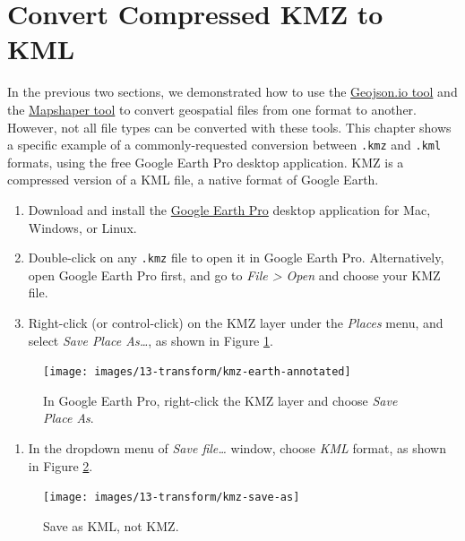 \documentclass[
  english,
]{book}
\providecommand{\tightlist}{%
  \setlength{\itemsep}{0pt}\setlength{\parskip}{0pt}}
\begin{document}
\hypertarget{convert-kmz}{%
\section*{Convert Compressed KMZ to KML}\label{convert-kmz}}

In the previous two sections, we demonstrated how to use the \href{geojsonio.html}{Geojson.io tool} and the \href{mapshaper.html}{Mapshaper tool}
to convert geospatial files from one format to another. However, not all file types can be converted with these tools.
This chapter shows a specific example of a commonly-requested conversion between \texttt{.kmz} and \texttt{.kml} formats, using the free Google Earth Pro desktop application. KMZ is a compressed version of a KML file, a native format of Google Earth.

\begin{enumerate}
\def\labelenumi{\arabic{enumi}.}
\item
  Download and install the \href{https://www.google.com/earth/versions/}{Google Earth Pro} desktop application for Mac, Windows, or Linux.
\item
  Double-click on any \texttt{.kmz} file to open it in Google Earth Pro. Alternatively, open Google Earth Pro first,
  and go to \emph{File \textgreater{} Open} and choose your KMZ file.
\item
  Right-click (or control-click) on the KMZ layer under the \emph{Places} menu, and select \emph{Save Place As\ldots{}}, as shown in Figure \ref{fig:kmz-earth}.
\end{enumerate}



\begin{figure}
\texttt{[image: images/13-transform/kmz-earth-annotated]} \caption{In Google Earth Pro, right-click the KMZ layer and choose \emph{Save Place As}.}\label{fig:kmz-earth}
\end{figure}

\begin{enumerate}
\def\labelenumi{\arabic{enumi}.}
\setcounter{enumi}{3}
\tightlist
\item
  In the dropdown menu of \emph{Save file\ldots{}} window, choose \emph{KML} format, as shown in Figure \ref{fig:kmz-save-as}.
\end{enumerate}



\begin{figure}
\texttt{[image: images/13-transform/kmz-save-as]} \caption{Save as KML, not KMZ.}\label{fig:kmz-save-as}
\end{figure}
\end{document}
